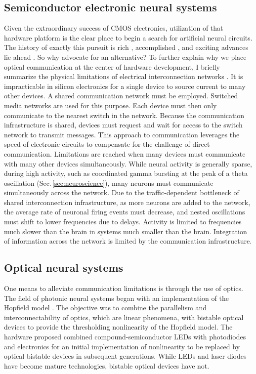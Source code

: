 \documentclass[twocolumn]{article}
\begin{document}
\subsection{Semiconductor electronic neural systems}
Given the extraordinary success of CMOS electronics, utilization of that hardware platform is the clear place to begin a search for artificial neural circuits. The history of exactly this pursuit is rich \cite{me1989,me1990,lide2015}, accomplished \cite{voma2007,inli2011,chst2014,aast2018,boro2018}, and exciting advances lie ahead \cite{stin2019}. So why advocate for an alternative? To further explain why we place optical communication at the center of hardware development, I briefly summarize the physical limitations of electrical interconnection networks \cite{hepa2012}. It is impracticable in silicon electronics for a single device to source current to many other devices. A shared communication network must be employed. Switched media networks are used for this purpose. Each device must then only communicate to the nearest switch in the network. Because the communication infrastructure is shared, devices must request and wait for access to the switch network to transmit messages. This approach to communication leverages the speed of electronic circuits to compensate for the challenge of direct communication. Limitations are reached when many devices must communicate with many other devices simultaneously. While neural activity is generally sparse, during high activity, such as coordinated gamma bursting at the peak of a theta oscillation (Sec.\,\ref{sec:neuroscience}), many neurons must communicate simultaneously across the network. Due to the traffic-dependent bottleneck of shared interconnection infrastructure, as more neurons are added to the network, the average rate of neuronal firing events must decrease, and nested oscillations must shift to lower frequencies due to delays. Activity is limited to frequencies much slower than the brain in systems much smaller than the brain. Integration of information across the network is limited by the communication infrastructure.

\subsection{Optical neural systems}
One means to alleviate communication limitations is through the use of optics. The field of photonic neural systems began \cite{psfa1985,faps1985} with an implementation of the Hopfield model \cite{ho1982}. The objective was to combine the parallelism and interconnectability of optics, which are linear phenomena, with bistable optical devices to provide the thresholding nonlinearity of the Hopfield model. The hardware proposed combined compound-semiconductor LEDs with photodiodes and electronics for an initial implementation of nonlinearity to be replaced by optical bistable devices in subsequent generations. While LEDs and laser diodes have become mature technologies, bistable optical devices have not.
\end{document}
